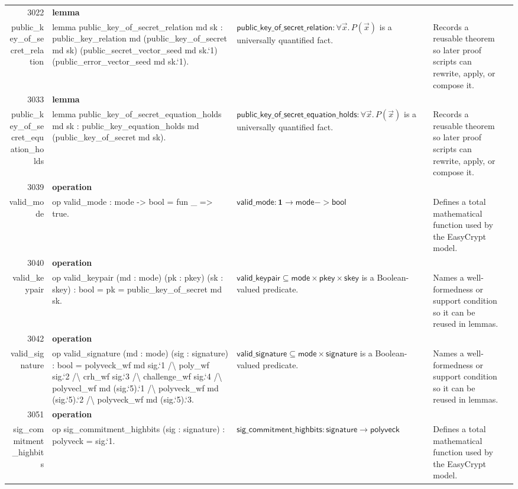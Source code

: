 \documentclass[10pt]{article}
\newcommand{\ec}[1]{\begingroup\ttfamily\scriptsize #1\endgroup}
\begin{document}
\begin{longtable}{r L{0.17\textwidth} L{0.26\textwidth} L{0.27\textwidth} L{0.20\textwidth}}
3022 & \textbf{lemma}\\\ec{public\_key\_of\_secret\_relation} & \ec{lemma public\_key\_of\_secret\_relation md sk : public\_key\_relation md (public\_key\_of\_secret md sk) (public\_secret\_vector\_seed md sk.`1) (public\_error\_vector\_seed md sk.`1).} & \(\mathsf{public\_key\_of\_secret\_relation} : \forall \vec{x}.\, P(\vec{x})\) is a universally quantified fact. & Records a reusable theorem so later proof scripts can rewrite, apply, or compose it. \\
3033 & \textbf{lemma}\\\ec{public\_key\_of\_secret\_equation\_holds} & \ec{lemma public\_key\_of\_secret\_equation\_holds md sk : public\_key\_equation\_holds md (public\_key\_of\_secret md sk).} & \(\mathsf{public\_key\_of\_secret\_equation\_holds} : \forall \vec{x}.\, P(\vec{x})\) is a universally quantified fact. & Records a reusable theorem so later proof scripts can rewrite, apply, or compose it. \\
3039 & \textbf{operation}\\\ec{valid\_mode} & \ec{op valid\_mode : mode -> bool = fun \_ => true.} & \(\mathsf{valid\_mode} : \mathbf{1} \to \mathsf{mode -> bool}\) & Defines a total mathematical function used by the EasyCrypt model. \\
3040 & \textbf{operation}\\\ec{valid\_keypair} & \ec{op valid\_keypair (md : mode) (pk : pkey) (sk : skey) : bool = pk = public\_key\_of\_secret md sk.} & \(\mathsf{valid\_keypair} \subseteq \mathsf{mode} \times \mathsf{pkey} \times \mathsf{skey}\) is a Boolean-valued predicate. & Names a well-formedness or support condition so it can be reused in lemmas. \\
3042 & \textbf{operation}\\\ec{valid\_signature} & \ec{op valid\_signature (md : mode) (sig : signature) : bool = polyveck\_wf md sig.`1 /\textbackslash{} poly\_wf sig.`2 /\textbackslash{} crh\_wf sig.`3 /\textbackslash{} challenge\_wf sig.`4 /\textbackslash{} polyvecl\_wf md (sig.`5).`1 /\textbackslash{} polyveck\_wf md (sig.`5).`2 /\textbackslash{} polyveck\_wf md (sig.`5).`3.} & \(\mathsf{valid\_signature} \subseteq \mathsf{mode} \times \mathsf{signature}\) is a Boolean-valued predicate. & Names a well-formedness or support condition so it can be reused in lemmas. \\
3051 & \textbf{operation}\\\ec{sig\_commitment\_highbits} & \ec{op sig\_commitment\_highbits (sig : signature) : polyveck = sig.`1.} & \(\mathsf{sig\_commitment\_highbits} : \mathsf{signature} \to \mathsf{polyveck}\) & Defines a total mathematical function used by the EasyCrypt model. \\

\end{longtable}
\end{document}
